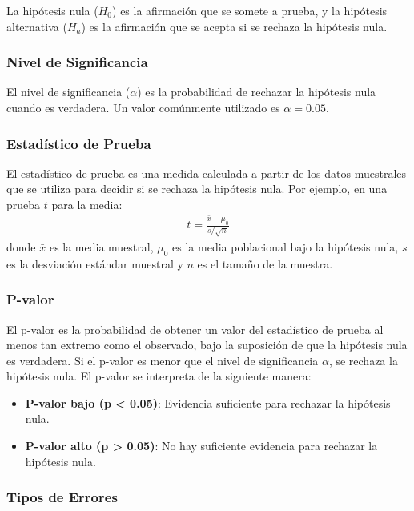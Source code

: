 \documentclass[a4paper]{report} %
\begin{document}
La hip\'otesis nula ($H_0$) es la afirmaci\'on que se somete a prueba, y la hip\'otesis alternativa ($H_a$) es la afirmaci\'on que se acepta si se rechaza la hip\'otesis nula.

\subsubsection{Nivel de Significancia}

El nivel de significancia ($\alpha$) es la probabilidad de rechazar la hip\'otesis nula cuando es verdadera. Un valor com\'unmente utilizado es $\alpha = 0.05$.

\subsubsection{Estad\'istico de Prueba}

El estad\'istico de prueba es una medida calculada a partir de los datos muestrales que se utiliza para decidir si se rechaza la hip\'otesis nula. Por ejemplo, en una prueba $t$ para la media:
\begin{eqnarray*}
t = \frac{\bar{x} - \mu_0}{s / \sqrt{n}}
\end{eqnarray*}
donde $\bar{x}$ es la media muestral, $\mu_0$ es la media poblacional bajo la hip\'otesis nula, $s$ es la desviaci\'on est\'andar muestral y $n$ es el tama\~no de la muestra.

\subsubsection{P-valor}

El p-valor es la probabilidad de obtener un valor del estad\'istico de prueba al menos tan extremo como el observado, bajo la suposici\'on de que la hip\'otesis nula es verdadera. Si el p-valor es menor que el nivel de significancia $\alpha$, se rechaza la hip\'otesis nula. El p-valor se interpreta de la siguiente manera:

\begin{itemize}
    \item \textbf{P-valor bajo (p < 0.05)}: Evidencia suficiente para rechazar la hip\'otesis nula.
    \item \textbf{P-valor alto (p > 0.05)}: No hay suficiente evidencia para rechazar la hip\'otesis nula.
\end{itemize}

\subsubsection{Tipos de Errores}
\end{document}
